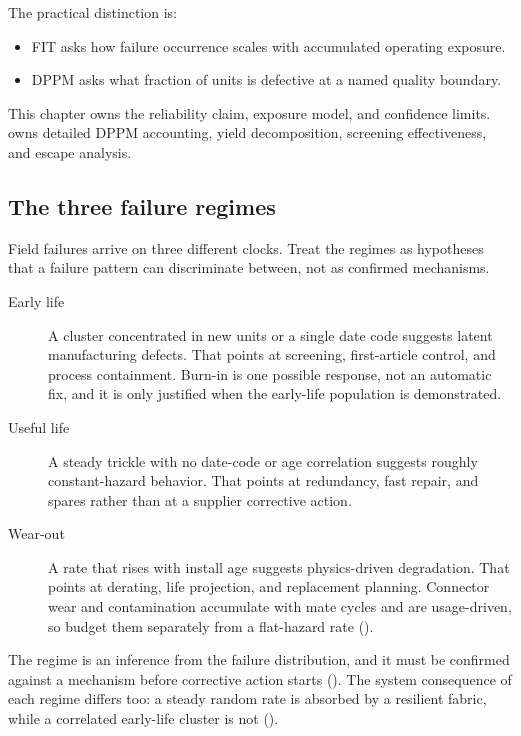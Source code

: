 The practical distinction is:
\begin{itemize}
\item FIT asks how failure occurrence scales with accumulated operating
      exposure.
\item DPPM asks what fraction of units is defective at a named quality
      boundary.
\end{itemize}

This chapter owns the reliability claim, exposure model, and confidence limits.
 owns detailed DPPM accounting, yield decomposition,
screening effectiveness, and escape analysis.

\subsection{The three failure regimes}
\label{sec:bathtub}

Field failures arrive on three different clocks. Treat the regimes as
hypotheses that a failure pattern can discriminate between, not as confirmed
mechanisms.

\begin{description}
\item[Early life] A cluster concentrated in new units or a single date code
      suggests latent manufacturing defects. That points at screening,
      first-article control, and process containment. Burn-in is one possible
      response, not an automatic fix, and it is only justified when the
      early-life population is demonstrated.
\item[Useful life] A steady trickle with no date-code or age correlation
      suggests roughly constant-hazard behavior. That points at redundancy,
      fast repair, and spares rather than at a supplier corrective action.
\item[Wear-out] A rate that rises with install age suggests physics-driven
      degradation. That points at derating, life projection, and replacement
      planning. Connector wear and contamination accumulate with mate cycles
      and are usage-driven, so budget them separately from a flat-hazard rate
      ().
\end{description}

The regime is an inference from the failure distribution, and it must be
confirmed against a mechanism before corrective action starts
(). The system consequence of each regime differs too: a
steady random rate is absorbed by a resilient fabric, while a correlated
early-life cluster is not ().

